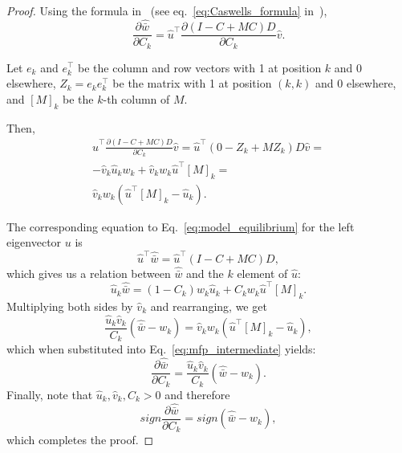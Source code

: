 \documentclass[9pt, a4paper, twocolumn]{extarticle}
\newcommand*{\tr}{^\intercal}
\begin{document}
\begin{proof}
Using the formula in~\citet{Caswell1978} (see eq.~\ref{eq:Caswells_formula} in~),
\begin{equation}
\frac{\partial \hat{\bar w}}{\partial C_k} = 
\hat u\tr \frac{\partial (I-C+MC)D}{\partial C_k} \hat v.
\end{equation}

Let $e_k$ and $e\tr_k$ be the column and row vectors with 1 at position $k$ and 0 elsewhere, $Z_k = e_k e\tr_k$ be the matrix with 1 at position $(k,k)$ and 0 elsewhere, and $[M]_k$ be the $k$-th column of $M$.

Then,
\begin{equation}\label{eq:mfp_intermediate}
\begin{aligned}
\hat u\tr \frac{\partial (I-C+MC)D}{\partial C_k} \hat v = 
\hat u\tr (0 - Z_k + M Z_k)D \hat v = \\
-\hat v_k \hat u_k w_k + \hat v_k w_k \hat u\tr[M]_k = \\
\hat v_k w_k (\hat u\tr[M]_k - \hat u_k). 
\end{aligned}
\end{equation}

The corresponding equation to Eq.~\ref{eq:model_equilibrium} for the left
eigenvector $u$ is 
\begin{equation}
\hat u\tr \hat{\bar w} = \hat u\tr (I - C + MC) D,
\end{equation}
which gives us a relation between $\hat{\bar w}$ and the $k$
element of $\hat u$:
\begin{equation}
\hat u_k \hat{\bar w} = (1-C_k) w_k \hat u_k + C_k w_k \hat u\tr [M]_k.
\end{equation}
Multiplying both sides by $\hat v_k$  and rearranging, we get 
\begin{equation}
\frac{\hat u_k \hat v_k}{C_k} (\hat{\bar w} - w_k) = \hat v_k w_k (\hat u\tr [M]_k - \hat u_k),
\end{equation}
which when substituted into Eq.~\ref{eq:mfp_intermediate} yields:
\begin{equation}
\frac{\partial \hat{\bar w}}{\partial C_k} = 
\frac{\hat u_k \hat v_k}{C_k} (\hat{\bar w} - w_k).
\end{equation}
Finally, note that $\hat u_k, \hat v_k, C_k > 0$ and therefore
\begin{equation}
sign \frac{\partial \hat{\bar w}}{\partial C_k} = 
sign (\hat{\bar w} - w_k),
\end{equation}
which completes the proof.
\end{proof}
\end{document}
